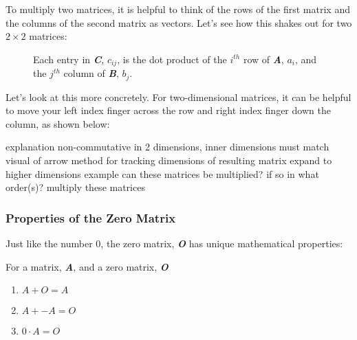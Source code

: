 To multiply two matrices, it is helpful to think of the rows of the first matrix and the columns of the second matrix as vectors. Let's see how this shakes out for two $2 \times 2$ matrices:

\begin{figure}[h!]
    \centering
    \caption{Each entry in \textbf{\textit{C}}, $c_{ij}$, is the dot product of the $i^{th}$ row of \textbf{\textit{A}}, $a_i$, and the $j^{th}$ column of \textbf{\textit{B}}, $b_j$.}
    \label{fig:mat_mult}
\end{figure}

 Let's look at this more concretely. For two-dimensional matrices, it can be helpful to move your left index finger across the row and right index finger down the column, as shown below:

explanation
	non-commutative
	in 2 dimensions, inner dimensions must match
	visual of arrow method for tracking
	dimensions of resulting matrix
	expand to higher dimensions
example
	can these matrices be multiplied? if so in what order(s)?
	multiply these matrices
	
\subsubsection{Properties of the Zero Matrix}
Just like the number 0, the zero matrix, \textbf{\textit{O}} has unique mathematical properties:
\begin{mdframed}[style = important, frametitle = {Properties of the Zero Matrix}]
For a matrix, \textbf{\textit{A}}, and a zero matrix, \textbf{\textit{O}}
\begin{enumerate}
\item $\mathbf{\mathit{A}} + \mathbf{\mathit{O}} = \mathbf{\mathit{A}}$
\item $\mathbf{\mathit{A}} + \mathbf{\mathit{-A}} = \mathbf{\mathit{O}}$
\item $0 \cdot \mathbf{\mathit{A}} = \mathbf{\mathit{O}}$
\end{enumerate}
\end{mdframed}

